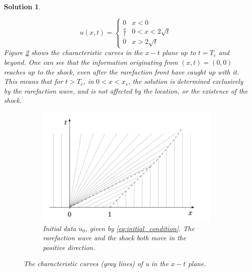 \documentclass[10pt,letterpaper]{article}
\theoremstyle{break}
\newtheorem{mysolution}{Solution}
\newenvironment{solution}{\begin{mysolution}}{\end{mysolution}}
\begin{document}
\begin{solution}
\begin{itemize}
        $$
        u(x, t)=\left\{\begin{array}{ll}
        0 & x<0 \\
        \frac{x}{t} & 0<x<2 \sqrt{t} \\
        0 & x>2 \sqrt{t}
        \end{array}\right.
        $$
        Figure \ref{problem3_part2} shows the characteristic curves in the $x-t$ plane up to $t=T_{c}$ and beyond. One can see that the information originating from $(x, t)=(0,0)$ reaches up to the shock, even after the rarefaction front have caught up with it. This means that for $t>T_{c}$, in $0<x<x_{s}$, the solution is determined exclusively by the rarefaction wave, and is not affected by the location, or the existence of the shock.
        
        \begin{figure}
            \centering
            \begin{subfigure}[b]{0.5\textwidth}
                \includegraphics[width=\textwidth]{figures02/ex_set_2_4} 
                \caption{Initial data $u_0$, given by \eqref{eq:initial_condition}.
                The rarefaction wave and the shock both move in the positive direction.}
                \label{fig:u_0_later}
            \end{subfigure}
            \caption{The characteristic curves (gray lines) of u in the $x-t$ plane.}
            \label{problem3_part2}
        \end{figure}
    \end{itemize}
    
\end{solution}
\end{document}
